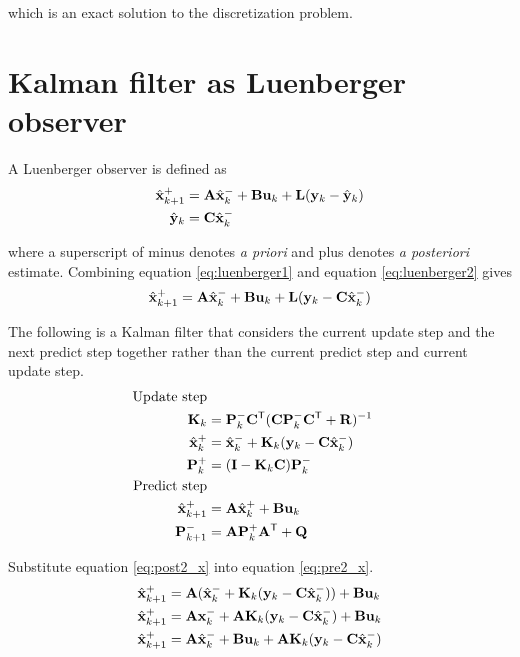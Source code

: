 which is an exact solution to the \gls{discretization} problem.

\section{Kalman filter as Luenberger observer}
\label{sec:deriv_kalman_luenberger}

A Luenberger \gls{observer} is defined as
\begin{align}
  \hat{\mathbf{x}}_{k+1}^+ &= \mathbf{A}\hat{\mathbf{x}}_k^- + \mathbf{B}\mathbf{u}_k + \mathbf{L}
    (\mathbf{y}_k - \hat{\mathbf{y}}_k) \label{eq:luenberger1} \\
  \hat{\mathbf{y}}_k &= \mathbf{C} \hat{\mathbf{x}}_k^- \label{eq:luenberger2}
\end{align}

where a superscript of minus denotes \textit{a priori} and plus denotes
\textit{a posteriori} estimate. Combining equation \eqref{eq:luenberger1} and
equation \eqref{eq:luenberger2} gives
\begin{equation} \label{eq:luenberger}
  \hat{\mathbf{x}}_{k+1}^+ = \mathbf{A}\hat{\mathbf{x}}_k^- + \mathbf{B}\mathbf{u}_k + \mathbf{L}
    (\mathbf{y}_k - \mathbf{C}\hat{\mathbf{x}}_k^-)
\end{equation}

The following is a Kalman filter that considers the current update step and the
next predict step together rather than the current predict step and current
update step.
\begin{align}
  \text{Update step} \nonumber \\
  \mathbf{K}_k &= \mathbf{P}_k^- \mathbf{C}^\mathsf{T} (\mathbf{C}\mathbf{P}_k^- \mathbf{C}^\mathsf{T} +
    \mathbf{R})^{-1} \\
  \hat{\mathbf{x}}_k^+ &= \hat{\mathbf{x}}_k^- + \mathbf{K}_k(\mathbf{y}_k -
    \mathbf{C}\hat{\mathbf{x}}_k^-) \label{eq:post2_x} \\
  \mathbf{P}_k^+ &= (\mathbf{I} - \mathbf{K}_k\mathbf{C})\mathbf{P}_k^- \\
  \text{Predict step} \nonumber \\
  \hat{\mathbf{x}}_{k+1}^+ &= \mathbf{A}\hat{\mathbf{x}}_k^+ + \mathbf{B}\mathbf{u}_k
    \label{eq:pre2_x} \\
  \mathbf{P}_{k+1}^- &= \mathbf{A} \mathbf{P}_k^+ \mathbf{A}^\mathsf{T} + \mathbf{Q}
\end{align}

Substitute equation \eqref{eq:post2_x} into equation \eqref{eq:pre2_x}.
\begin{align*}
  \hat{\mathbf{x}}_{k+1}^+ &= \mathbf{A}(\hat{\mathbf{x}}_k^- + \mathbf{K}_k(\mathbf{y}_k -
    \mathbf{C}\hat{\mathbf{x}}_k^-)) + \mathbf{B}\mathbf{u}_k \\
  \hat{\mathbf{x}}_{k+1}^+ &= \mathbf{A}\mathbf{x}_k^- + \mathbf{A}\mathbf{K}_k(\mathbf{y}_k -
    \mathbf{C}\hat{\mathbf{x}}_k^-) + \mathbf{B}\mathbf{u}_k \\
  \hat{\mathbf{x}}_{k+1}^+ &= \mathbf{A}\hat{\mathbf{x}}_k^- + \mathbf{B}\mathbf{u}_k +
    \mathbf{A}\mathbf{K}_k(\mathbf{y}_k - \mathbf{C}\hat{\mathbf{x}}_k^-)
\end{align*}

